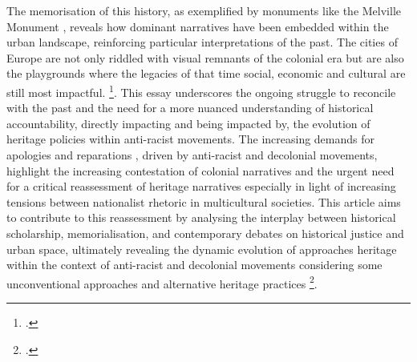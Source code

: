 \documentclass{scrartcl}
\renewcommand{\cite}{\parencite}
\begin{document}
The memorisation of this history, as exemplified by monuments like the Melville Monument , reveals how dominant narratives have been embedded within the urban landscape, reinforcing particular interpretations of the past. The cities of Europe are not only riddled with visual remnants of the colonial era but are also the playgrounds where the legacies of that time social, economic and cultural are still most impactful.   \footcite["While in some cityscapes – often those of European metropoles – the challenge is to sufficiently evoke a colonial past effectively repressed or erased from the collective memory, in other cities – as is well illustrated in the article by Joffre and Shepherd on Cape Town – the echoes of past atrocities and the ghosts of individuals enslaved, abused or murdered are everywhere present." 
][p.4]{kolvraa_decolonizing_2020}. 
This essay  underscores the ongoing struggle to reconcile with the past and the need for a more nuanced understanding of historical accountability, directly impacting and being impacted by, the evolution of heritage policies within anti-racist movements.
The increasing demands for apologies and reparations \cite[][]{hartel_2024}, driven by anti-racist and decolonial movements, highlight the increasing contestation of colonial narratives and the urgent need for a critical reassessment of heritage narratives especially in light of increasing tensions between nationalist rhetoric in multicultural societies. This article aims to contribute to this reassessment by analysing the interplay between historical scholarship, memorialisation, and contemporary debates on historical justice and urban space, ultimately revealing the dynamic evolution of approaches heritage within the context of anti-racist and decolonial movements  considering some unconventional approaches and alternative heritage practices \footcite[this would imply a rethinking of the interface between information and aesthetics in the symbolic representation of past atrocities: If – as is illustrated in the article by Knudsen and Kølvraa – colonial oppression and its present echoes must be approached not just in terms of knowledge, but also understood in terms of affects, then we need a form of heritage management that can speak to that affective dimension of collective memory. Here a more flexible and less institutionalized mode of heritage management – as we see it emerging not just from artists, but also from activists employing situationist or other aesthetic means, and from museums seeking new collaborations with artists or advocacy groups – might better serve the decolonial agenda than more traditional and rigorous didactics focusing on imparting information to the public. 
][p.4]{kolvraa_decolonizing_2020}.
\end{document}
